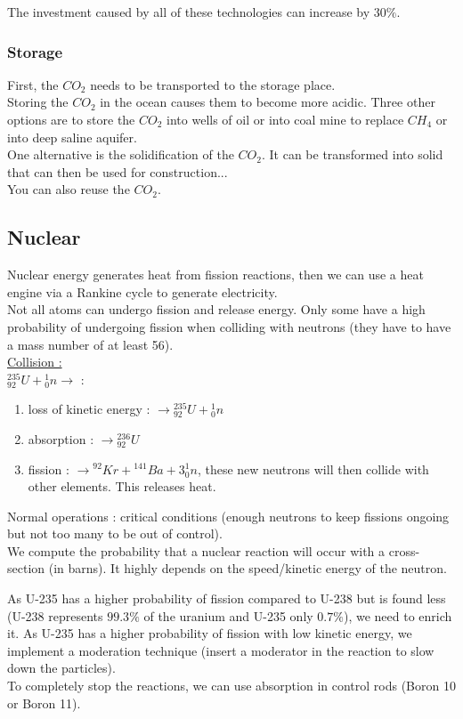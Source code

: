 \documentclass[../main.tex]{subfiles}
\begin{document}
The investment caused by all of these technologies can increase by $30\%$.\\

\subsubsection{Storage}
First, the $CO_2$ needs to be transported to the storage place. \\
Storing the $CO_2$ in the ocean causes them to become more acidic. Three other options are to store the $CO_2$ into wells of oil or into coal mine to replace $CH_4$ or into deep saline aquifer.\\
One alternative is the solidification of the $CO_2$. It can be transformed into solid that can then be used for construction... \\
You can also reuse the $CO_2$.

\subsection{Nuclear}
Nuclear energy generates heat from fission reactions, then we can use a heat engine via a Rankine cycle to generate electricity. \\
Not all atoms can undergo fission and release energy. Only some have a high probability of undergoing fission when colliding with neutrons (they have to have a mass number of at least 56).\\

\quad \underline{Collision :}\\
${}^{235}_{92} U + {}^1_0n \rightarrow $ : \begin{enumerate}
    \item loss of kinetic energy : $\rightarrow {}^{235}_{92} U + {}^1_0n$
    \item absorption : $\rightarrow {}^{236}_{92} U$
    \item fission : $\rightarrow {}^{92} Kr +{}^{141} Ba +  3{}^1_0n$, these new neutrons will then collide with other elements. This releases heat.
\end{enumerate}
Normal operations : critical conditions (enough neutrons to keep fissions ongoing but not too many to be out of control).\\

We compute the probability that a nuclear reaction will occur with a cross-section (in barns). It highly depends on the speed/kinetic energy of the neutron. 

As U-235 has a higher probability of fission compared to U-238 but is found less (U-238 represents $99.3\%$ of the uranium and U-235 only $0.7\%$), we need to enrich it. As U-235 has a higher probability of fission with low kinetic energy, we implement a moderation technique (insert a moderator in the reaction to slow down the particles). \\
To completely stop the reactions, we can use absorption in control rods (Boron 10 or Boron 11).\\
\end{document}
